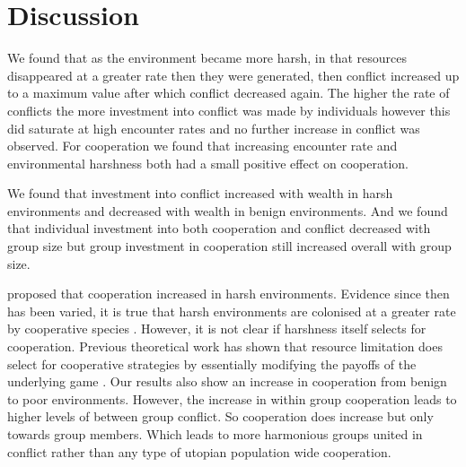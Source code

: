 \section{Discussion}

We found that as the environment became more harsh, in that resources disappeared at a greater rate then they were generated, then conflict increased up to a maximum value after which conflict decreased again. The higher the rate of conflicts the more investment into conflict was made by individuals however this did saturate at high encounter rates and no further increase in conflict was observed. 
For cooperation we found that increasing encounter rate and environmental harshness both had a small positive effect on cooperation. 

We found that investment into conflict increased with wealth in harsh environments and decreased with wealth in benign environments. And we found that individual investment into both cooperation and conflict decreased with group size but group investment in cooperation still increased overall with group size. 

 proposed that cooperation increased in harsh environments. Evidence since then has been varied, it is true that harsh environments are colonised at a greater rate by cooperative species \citep{cornwallisCooperationFacilitates2017}. However, it is not clear if harshness itself selects for cooperation. Previous theoretical work has shown that resource limitation does select for cooperative strategies by essentially modifying the payoffs of the underlying game \citep{requejoEvolutionCooperation2011,smaldinoIncreasedCosts2013b}. Our results also show an increase in cooperation from benign to poor environments. However, the increase in within group cooperation leads to higher levels of between group conflict. So cooperation does increase but only towards group members. Which leads to more harmonious groups united in conflict rather than any type of utopian population wide cooperation.

